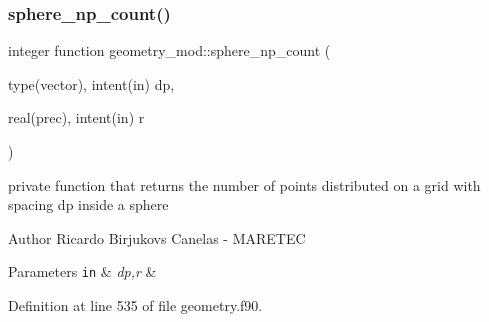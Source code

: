 \subsubsection{\texorpdfstring{sphere\+\_\+np\+\_\+count()}{sphere\_np\_count()}}
{\footnotesize\ttfamily integer function geometry\+\_\+mod\+::sphere\+\_\+np\+\_\+count (\begin{DoxyParamCaption}\item[{type(vector), intent(in)}]{dp,  }\item[{real(prec), intent(in)}]{r }\end{DoxyParamCaption})\hspace{0.3cm}{\ttfamily [private]}}



private function that returns the number of points distributed on a grid with spacing dp inside a sphere 

\begin{DoxyAuthor}{Author}
Ricardo Birjukovs Canelas -\/ M\+A\+R\+E\+T\+EC 
\end{DoxyAuthor}

\begin{DoxyParams}[1]{Parameters}
\mbox{\tt in}  & {\em dp,r} & \\
\hline
\end{DoxyParams}


Definition at line 535 of file geometry.\+f90.


